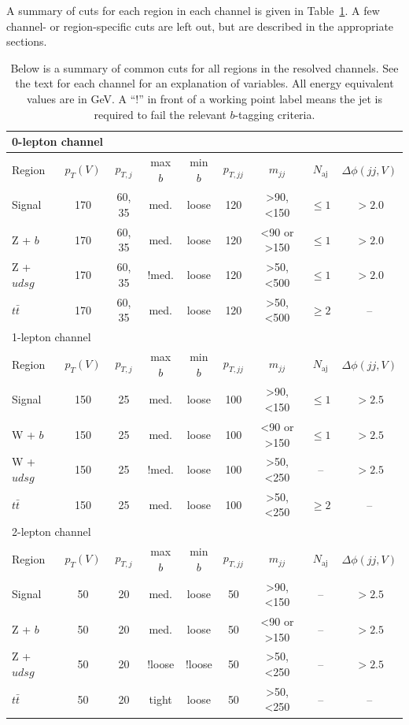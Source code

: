 A summary of cuts for each region in each channel
is given in Table~\ref{tab:resolved}.
A few channel- or region-specific cuts are left out,
but are described in the appropriate sections.
\begin{table}
  \centering
  \caption[Summary of resolved selection cuts]{
    Below is a summary of common cuts for all regions in the resolved channels.
    See the text for each channel for an explanation of variables.
    All energy equivalent values are in GeV.
    A ``!'' in front of a working point label means the jet is required to fail the relevant $b$-tagging criteria.
  }
  \begin{tabular}{|l|c|c|c|c|c|c|c|c|}
    \hline
    \multicolumn{9}{|l|}{0-lepton channel} \\
    \hline
    Region & $p_T(V)$ & $p_{T,j}$ & max $b$ & min $b$ & $p_{T,jj}$ & $m_{jj}$ & $N_\textrm{aj}$ & $\Delta\phi(jj, V)$ \\
    \hline
    Signal & 170 & 60, 35 & med. & loose & 120 & >90, <150 & $\le 1$ & $> 2.0$ \\
    Z + $b$ & 170 & 60, 35 & med. & loose & 120 & <90 or >150 & $\le 1$ & $> 2.0$ \\
    Z + $udsg$ & 170 & 60, 35 & !med. & loose & 120 & >50, <500 & $\le 1$ & $> 2.0$ \\
    $t\bar{t}$ & 170 & 60, 35 & med. & loose & 120 & >50, <500 & $\ge 2$ & -- \\
    \hline
    \hline
    \multicolumn{9}{|l|}{1-lepton channel} \\
    \hline
    Region & $p_T(V)$ & $p_{T,j}$ & max $b$ & min $b$ & $p_{T,jj}$ & $m_{jj}$ & $N_\textrm{aj}$ & $\Delta\phi(jj, V)$ \\
    \hline
    Signal & 150 & 25 & med. & loose & 100 & >90, <150 & $\le 1$ & $> 2.5$ \\
    W + $b$ & 150 & 25 & med. & loose & 100 & <90 or >150 & $\le 1$ & $> 2.5$ \\
    W + $udsg$ & 150 & 25 & !med. & loose & 100 & >50, <250 & -- & $> 2.5$ \\
    $t\bar{t}$ & 150 & 25 & med. & loose & 100 & >50, <250 & $\ge 2$ & -- \\
    \hline
    \hline
    \multicolumn{9}{|l|}{2-lepton channel} \\
    \hline
    Region & $p_T(V)$ & $p_{T,j}$ & max $b$ & min $b$ & $p_{T,jj}$ & $m_{jj}$ & $N_\textrm{aj}$ & $\Delta\phi(jj, V)$ \\
    \hline
    Signal & 50 & 20 & med. & loose & 50 & >90, <150 & -- & $> 2.5$ \\
    Z + $b$ & 50 & 20 & med. & loose & 50 & <90 or >150 & -- & $> 2.5$ \\
    Z + $udsg$ & 50 & 20 & !loose & !loose & 50 & >50, <250 & -- & $> 2.5$ \\
    $t\bar{t}$ & 50 & 20 & tight & loose & 50 & >50, <250 & -- & -- \\
    \hline
  \end{tabular}
  \label{tab:resolved}
\end{table}
